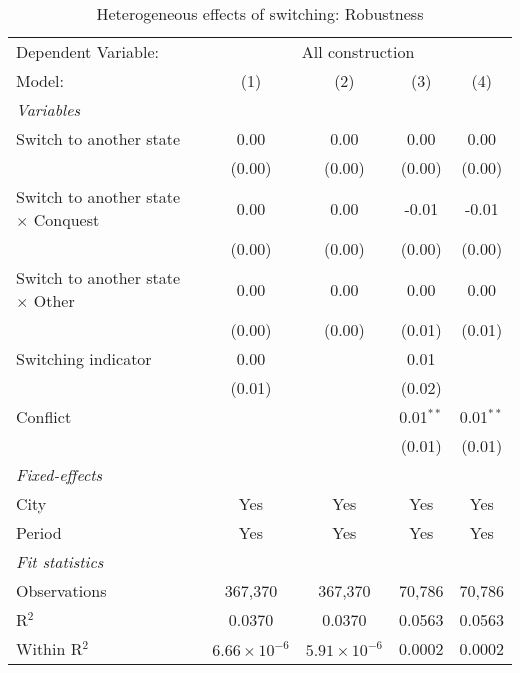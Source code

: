\begin{table}[htbp]
   \caption{\label{tab:controls_1y} Heterogeneous effects of switching: Robustness}
   \centering
   \begin{tabular}{lcccc}
      \tabularnewline \midrule \midrule
      Dependent Variable: & \multicolumn{4}{c}{All construction}\\
      Model:                                     & (1)                   & (2)                   & (3)         & (4)\\  
      \midrule
      \emph{Variables}\\
      Switch to another state                    & 0.00                  & 0.00                  & 0.00        & 0.00\\   
                                                 & (0.00)                & (0.00)                & (0.00)      & (0.00)\\   
      Switch to another state $\times$ Conquest  & 0.00                  & 0.00                  & -0.01       & -0.01\\   
                                                 & (0.00)                & (0.00)                & (0.00)      & (0.00)\\   
      Switch to another state $\times$ Other     & 0.00                  & 0.00                  & 0.00        & 0.00\\   
                                                 & (0.00)                & (0.00)                & (0.01)      & (0.01)\\   
      Switching indicator                        & 0.00                  &                       & 0.01        &   \\   
                                                 & (0.01)                &                       & (0.02)      &   \\   
      Conflict                                   &                       &                       & 0.01$^{**}$ & 0.01$^{**}$\\   
                                                 &                       &                       & (0.01)      & (0.01)\\   
      \midrule
      \emph{Fixed-effects}\\
      City                                       & Yes                   & Yes                   & Yes         & Yes\\  
      Period                                     & Yes                   & Yes                   & Yes         & Yes\\  
      \midrule
      \emph{Fit statistics}\\
      Observations                               & 367,370               & 367,370               & 70,786      & 70,786\\  
      R$^2$                                      & 0.0370                & 0.0370                & 0.0563      & 0.0563\\  
      Within R$^2$                               & $6.66\times 10^{-6}$  & $5.91\times 10^{-6}$  & 0.0002      & 0.0002\\  
      \midrule \midrule
      

\end{tabular}
\end{table}

